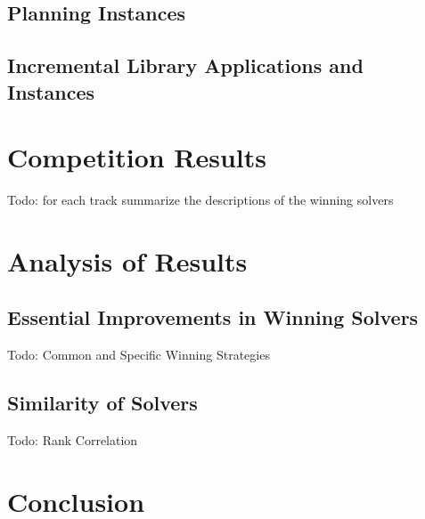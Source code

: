 \documentclass{elsarticle}
\newcommand{\todo}[1]{{\color{purple}Todo: #1}}
\begin{document}
\subsection{Planning Instances}

\subsection{Incremental Library Applications and Instances}


\section{Competition Results}

\todo{for each track summarize the descriptions of the winning solvers}


\section{Analysis of Results}

\subsection{Essential Improvements in Winning Solvers}

\todo{Common and Specific Winning Strategies}

\subsection{Similarity of Solvers}

\todo{Rank Correlation}


\section{Conclusion}





\end{document}
